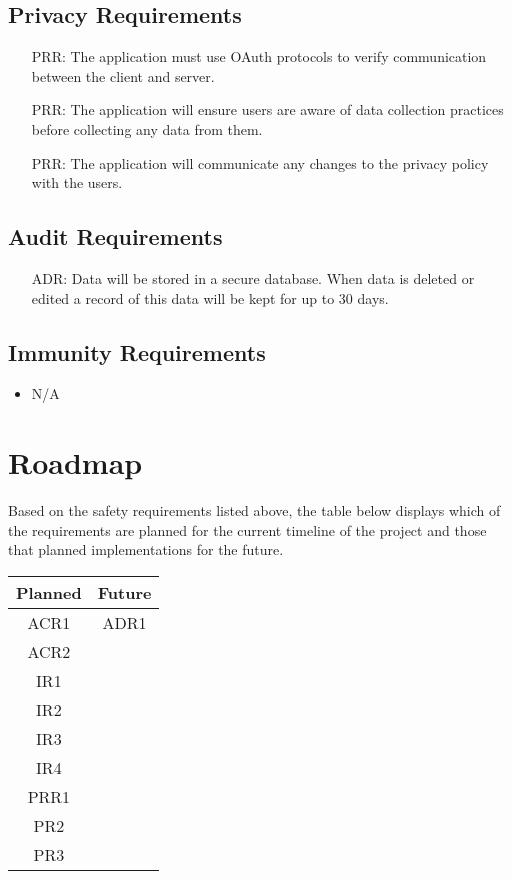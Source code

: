 \documentclass{article}
\newcounter{PRRnum}
\newcounter{ADRnum}
\begin{document}
	\subsection{Privacy Requirements}
	\noindent 
	\begin{itemize}
		\item[PRR\refstepcounter{PRRnum}\thePRRnum:]
		The application must use OAuth protocols to verify communication between the client and server.
		\item[PRR\refstepcounter{PRRnum}\thePRRnum:]
		The application will ensure users are aware of data collection practices before collecting any data from them.
		\item[PRR\refstepcounter{PRRnum}\thePRRnum:]
		The application will communicate any changes to the privacy policy with the users.	
	\end{itemize}
	\subsection{Audit Requirements}
	\noindent
	\begin{itemize}
		\item[ADR\refstepcounter{ADRnum}\theADRnum:]
		Data will be stored in a secure database. When data is deleted or edited a record of this data will be kept for up to 30 days.
	\end{itemize}
	\subsection{Immunity Requirements}
	\noindent 
	\begin{itemize}
		\item N/A
	\end{itemize}
	
	
	\section{Roadmap}
	
	
	Based on the safety requirements listed above, the table below displays which of the requirements are planned for the current timeline of the project and those that planned implementations for the future.
	
	\begin{center}
		\begin{tabular}{ |c|c| } 
			\hline
			Planned & Future \\
			\hline 
			\hline
			ACR1 & ADR1 \\ 
			\hline
			ACR2 & \\
			\hline
			IR1 & \\
			\hline
			IR2 & \\
			\hline
			IR3 & \\
			\hline
			IR4 & \\
			\hline 
			PRR1 & \\ 
			\hline
			PR2 & \\
			\hline
			PR3 & \\
			\hline
		\end{tabular}
	\end{center}
\end{document}
